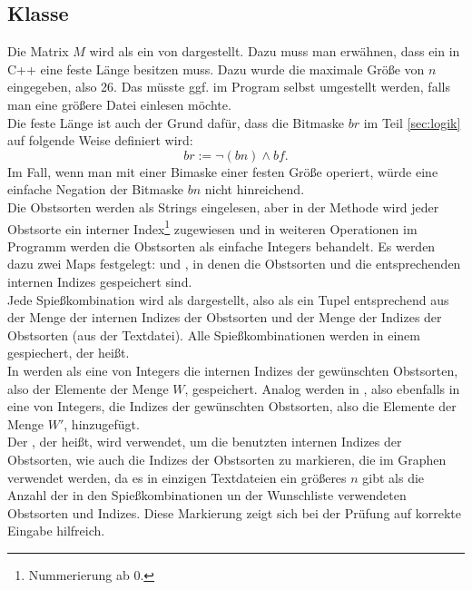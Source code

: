 \subsection{Klasse }
Die Matrix $M$ wird als ein  von  dargestellt.
Dazu muss man erwähnen, dass ein  in C++ eine feste Länge besitzen muss.
Dazu wurde die maximale Größe von $n$ eingegeben, also 26.
Das müsste ggf. im Program selbst umgestellt werden,
falls man eine größere Datei einlesen möchte.\\
Die feste Länge ist auch der Grund dafür, dass die Bitmaske $br$ im Teil \ref{sec:logik}
auf folgende Weise definiert wird:
\[
br := \neg(bn) \land bf.
\]
Im Fall, wenn man mit einer Bimaske einer festen Größe operiert, würde 
eine einfache Negation der Bitmaske $bn$ nicht hinreichend.\\

Die Obstsorten werden als Strings eingelesen, aber in der Methode 
wird jeder Obstsorte ein interner Index\footnote{Nummerierung ab 0.} zugewiesen
und in weiteren Operationen im Programm
werden die Obstsorten als einfache Integers behandelt. 
Es werden dazu zwei Maps festgelegt:  und , 
in denen die Obstsorten und die entsprechenden internen Indizes gespeichert sind.\\

Jede Spießkombination wird als  dargestellt, also als ein Tupel entsprechend
aus der Menge der internen Indizes der Obstsorten und der Menge der Indizes der Obstsorten (aus der Textdatei).
Alle Spießkombinationen werden in einem  gespiechert, der  heißt.\\

In  werden als eine  von Integers die internen Indizes der gewünschten 
Obstsorten, also der Elemente der Menge $W$, gespeichert.
Analog werden in , also ebenfalls in eine  von Integers, die Indizes der gewünschten 
Obstsorten, also die Elemente der Menge $W'$, hinzugefügt.\\ 

Der , der  heißt, wird verwendet, um die benutzten internen Indizes der Obstsorten,
wie auch die Indizes der Obstsorten zu markieren, die im Graphen verwendet werden,
da es in einzigen Textdateien ein größeres $n$ gibt als die Anzahl der in den Spießkombinationen 
un der Wunschliste verwendeten Obstsorten und Indizes. 
Diese Markierung zeigt sich bei der Prüfung auf korrekte Eingabe hilfreich.\\

